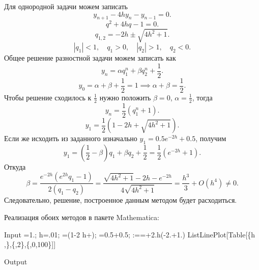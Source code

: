 \documentclass[a4paper]{article}
\begin{document}
\begin{sol}
Для однородной задачи можем записать
\[
y_{n+1}-4 h y_n-y_{n-1}=0
.\] 
\[
q^2+4 h q-1=0
.\] 
\[
q_{1,2}=-2h\pm \sqrt{4h^2+1} 
.\] 
\[
|q_1|<1,\quad q_1 >0,\quad |q_2|>1,\quad
q_2 <0
.\] 
Общее решение разностной задачи можем записать как
\[
y_n=\alpha q_1^n +\beta q_2^n +\frac{1}{2}
.\] 
\[
y_0=\alpha+\beta +\frac{1}{2}=1 \implies
\alpha+\beta =\frac{1}{2}
.\] 
Чтобы решение сходилось к $\frac{1}{2}$ нужно
положить $\beta=0$, $\alpha=\frac{1}{2}$, тогда
\[
	y_n=\frac{1}{2}\left(q_1^n+1\right)
.\] 
\[
	y_1=\frac{1}{2} \left( 
	1-2h +\sqrt{4h^2 +1} \right) 
.\] 
Если же исходить из заданного изначально
$y_1= 0.5 e^{-2h}+0.5$, получим
\[
	y_1=\left( \frac{1}{2}-\beta \right) q_1+ \beta q_2 +\frac{1}{2}= \frac{1}{2}\left( e^{-2h}+1 \right) 
.\] 
Откуда
\[
\beta=\frac{e^{-2 h} \left(e^{2 h} q_1-1\right)}{2 \left(q_1-q_2\right)}=
\frac{\sqrt{4 h^2+1}-2 h-e^{-2 h}}{4 \sqrt{4 h^2+1}}
=\frac{h^3}{3}+O(h^4)\neq 0
.\] 
Следовательно, решение, построенное данным
методом будет расходиться.

Реализация обоих методов в пакете Mathematica:
\begin{mmaCell}[moredefined={h,ListLinePlot},morepattern={i_, n_, i, n}]{Input}
  =1.;
  h=.01;
  =(1-2 h+);
  =0.5+0.5;
  :==+2.h(-2.+1.)
  ListLinePlot[Table[\{h ,\},\{,2\},\{,0,100\}]]
\end{mmaCell}
\begin{mmaCell}[moregraphics={moreig={scale=.7}}]{Output}
\end{mmaCell}
%
\end{sol}
\end{document}
